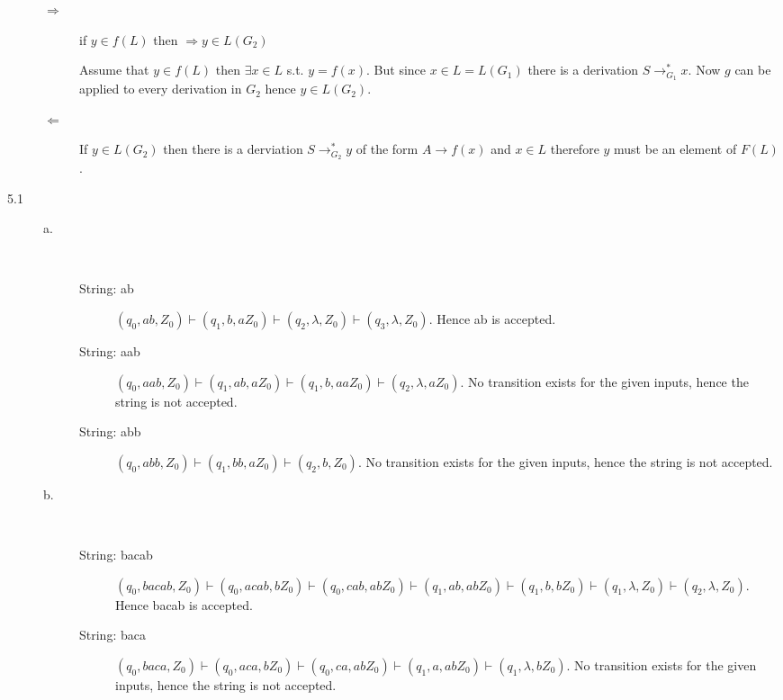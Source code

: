 \documentclass{article}
\begin{document}
\begin{description}
  \begin{description}
    \item[$\Rightarrow$]
      if $y \in f(L)$ then $\Rightarrow y \in L(G_2)$
      
      Assume that $y \in f(L)$ then $ \exists x \in L$ s.t. $y = f(x)$. But since $x \in L = L(G_1)$ there is a derivation $S \rightarrow^*_{G_1} x$. Now $g$ can be applied to every derivation in $G_2$ hence $y \in L(G_2)$.

      \item[$\Leftarrow$]
        If $y \in L(G_2)$ then there is a derviation $S \rightarrow^*_{G_2} y$ of the form $A \rightarrow f(x)$ and $x \in L$ therefore $y$ must be an element of $F(L)$.
  \end{description}

\item[5.1]
  \begin{description}
  \item[a.]\hfill\\
    \begin{description}
    \item[String: ab]
      $(q_0, ab, Z_0) \vdash (q_1, b, aZ_0) \vdash (q_2, \lambda, Z_0) \vdash (q_3, \lambda, Z_0)$. Hence ab is accepted.
    \item[String: aab]
      $(q_0, aab, Z_0) \vdash (q_1, ab, aZ_0) \vdash (q_1, b, aaZ_0) \vdash (q_2, \lambda, aZ_0)$. No transition exists for the given inputs, hence the string is not accepted.
    \item[String: abb]
      $(q_0, abb, Z_0) \vdash (q_1, bb, aZ_0) \vdash (q_2, b, Z_0)$. No transition exists for the given inputs, hence the string is not accepted.
    \end{description}
  \item[b.]\hfill\\
    \begin{description}
      \item[String: bacab]
        $(q_0, bacab, Z_0) \vdash (q_0, acab, bZ_0) \vdash (q_0, cab, abZ_0) \vdash (q_1, ab, abZ_0) \vdash (q_1, b, bZ_0) \vdash (q_1, \lambda, Z_0) \vdash (q_2, \lambda, Z_0)$. Hence bacab is accepted.
      \item[String: baca]
        $(q_0, baca, Z_0) \vdash (q_0, aca, bZ_0) \vdash (q_0 ,ca, abZ_0) \vdash (q_1, a, abZ_0) \vdash (q_1, \lambda, bZ_0)$. No transition exists for the given inputs, hence the string is not accepted.
    \end{description}
  \end{description}


\end{description}
\end{document}
